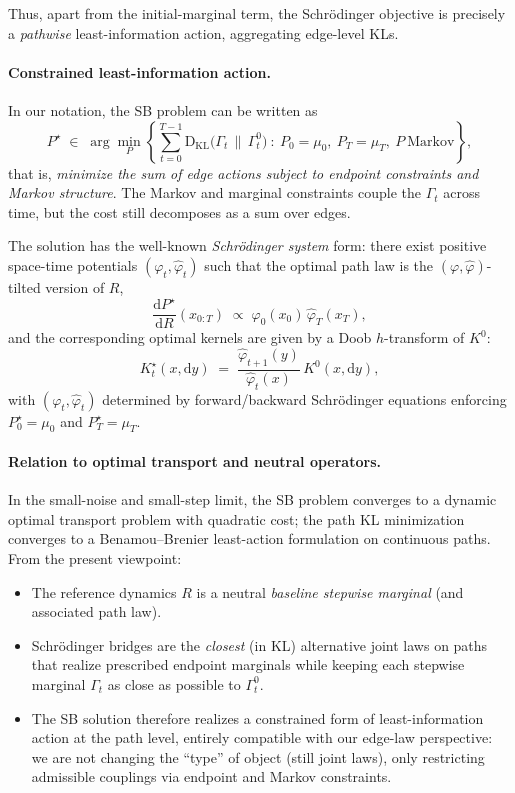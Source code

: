 \documentclass[11pt]{article}
\newcommand{\KL}{\mathrm{D}_{\mathrm{KL}}}
\newcommand{\1}{\mathbf{1}}
\begin{document}
Thus, apart from the initial-marginal term, the Schrödinger objective is precisely a \emph{pathwise} least-information action, aggregating edge-level KLs.

\paragraph{Constrained least-information action.}
In our notation, the SB problem can be written as
\[
	P^\star
	\;\in\;
	\arg\min_{P}
	\left\{
  	\sum_{t=0}^{T-1}
    	\KL\!\big(\Gamma_t \,\big\|\, \Gamma^0_t\big)
  	\ :\
  	P_0=\mu_0,\ P_T=\mu_T,\ P\ \text{Markov}
	\right\},
\]
that is, \emph{minimize the sum of edge actions subject to endpoint constraints and Markov structure}. The Markov and marginal constraints couple the $\Gamma_t$ across time, but the cost still decomposes as a sum over edges.

The solution has the well-known \emph{Schrödinger system} form: there exist positive space-time potentials $(\varphi_t,\hat\varphi_t)$ such that the optimal path law is the $(\varphi,\hat\varphi)$-tilted version of $R$,
\[
	\frac{\mathrm dP^\star}{\mathrm dR}(x_{0:T})
	\;\propto\;
	\varphi_0(x_0)\,\hat\varphi_T(x_T),
\]
and the corresponding optimal kernels are given by a Doob $h$-transform of $K^0$:
\[
	K_t^\star(x,\mathrm dy)
	\;=\;
	\frac{\hat\varphi_{t+1}(y)}{\hat\varphi_t(x)}
	\,K^0(x,\mathrm dy),
\]
with $(\varphi_t,\hat\varphi_t)$ determined by forward/backward Schrödinger equations enforcing $P^\star_0=\mu_0$ and $P^\star_T=\mu_T$.

\paragraph{Relation to optimal transport and neutral operators.}
In the small-noise and small-step limit, the SB problem converges to a dynamic optimal transport problem with quadratic cost; the path KL minimization converges to a Benamou--Brenier least-action formulation on continuous paths. From the present viewpoint:

\begin{itemize}[leftmargin=1.5em]
\item The reference dynamics $R$ is a neutral \emph{baseline stepwise marginal} 
(and associated path law).

\item Schrödinger bridges are the \emph{closest} (in KL) alternative
  joint laws on paths that realize prescribed endpoint marginals while
  keeping each stepwise marginal $\Gamma_t$ as close as possible to
  $\Gamma^0_t$.
  
\item The SB solution therefore realizes a constrained form of
  least-information action at the path level, entirely compatible with
  our edge-law perspective: we are not changing the “type” of object
  (still joint laws), only restricting admissible couplings via
  endpoint and Markov constraints.
\end{itemize}
\end{document}
